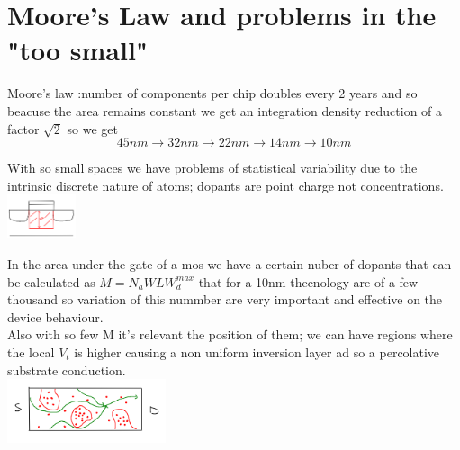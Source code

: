 \section{Moore's Law and problems in the "too small"}
Moore's law :number of components per chip doubles every 2 years and so beacuse the area remains constant we get an integration density reduction of a factor $\sqrt{2}$ so we get 
\begin{equation}
45nm \rightarrow 32nm \rightarrow 22nm \rightarrow 14nm \rightarrow 10nm
\end{equation}

\vspace{5mm}
With so small spaces we have problems of statistical variability due to the intrinsic discrete nature of atoms; dopants are point charge not concentrations.\\

\centering
\includegraphics[width=0.15\textwidth]{mosrand.png}\\
\raggedright

In the area under the gate of a mos we have a certain nuber of dopants that can be calculated as $M=N_aWLW_d^{max}$ that for a 10nm thecnology are of a few thousand so variation of this nummber are very important and effective on the device behaviour.\\
Also with so few M it's relevant the position of them; we can have regions where the local $V_t$ is higher causing a non uniform inversion layer ad so a percolative substrate conduction.\\ 


\centering
\includegraphics[width=0.35\textwidth]{percolative.png}\\
\raggedright

